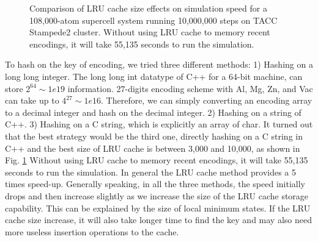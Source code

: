 \begingroup
\begin{figure}[!ht]
  \centering
\caption[Comparison of \acs{LRU} cache size effects on simulation speed for a 108,000-atom supercell system running 10,000,000 steps on TACC Stampede2 cluster.]{Comparison of \acs{LRU} cache size effects on simulation speed for a 108,000-atom supercell system running 10,000,000 steps on TACC Stampede2 cluster. Without using \ac{LRU} cache to memory recent encodings, it will take 55,135 seconds to run the simulation.}
\label{Chap:Al/Vac:fig:lru_size}
\end{figure}
\endgroup


To hash on the key of encoding, we tried three different methods: 1) Hashing on a long long integer. The long long int datatype of C++ for a 64-bit machine, can store $2^{64} \sim 1e19$ information. 27-digits encoding scheme with Al, Mg, Zn, and Vac can take up to $4^{27} \sim 1e16$. Therefore, we can simply converting an encoding array to a decimal integer and hash on the decimal integer. 2) Hashing on a string of C++. 3) Hashing on a C string, which is explicitly an array of char. It turned out that the best strategy would be the third one, directly hashing on a C string in C++ and the best size of \ac{LRU} cache is between 3,000 and 10,000, as shown in Fig. \ref{Chap:Al/Vac:fig:lru_size} Without using \ac{LRU} cache to memory recent encodings, it will take 55,135 seconds to run the simulation. In general the \ac{LRU} cache method provides a 5 times speed-up. Generally speaking, in all the three methods, the speed initially drops and then increase slightly as we increase the size of the \ac{LRU} cache storage capability. This can be explained by the size of local minimum states. If the \ac{LRU} cache size increase, it will also take longer time to find the key and may also need more useless insertion operations to the cache.


